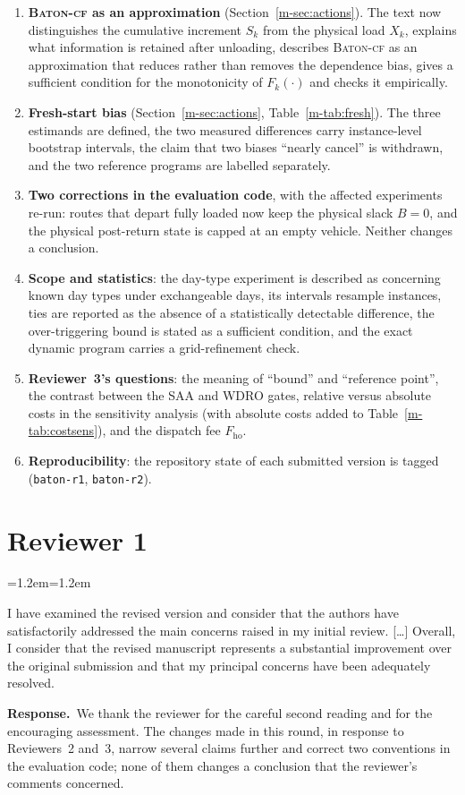 \documentclass[11pt]{article}
\newenvironment{comment}{\par\medskip\noindent\color{rev}\itshape
  \begin{list}{}{\leftmargin=1.2em\rightmargin=1.2em}\item[]}%
  {\end{list}\par}
\newcommand{\resp}{\par\noindent\textbf{Response.}\ }
\newcommand{\sref}[1]{Section~\ref{m-#1}}
\newcommand{\tref}[1]{Table~\ref{m-#1}}
\begin{document}
\begin{enumerate}[leftmargin=1.4em]
\item \textbf{\textsc{Baton-cf} as an approximation}
  (\sref{sec:actions}). The text now distinguishes the cumulative
  increment $S_k$ from the physical load $X_k$, explains what information
  is retained after unloading, describes \textsc{Baton-cf} as an
  approximation that reduces rather than removes the dependence bias,
  gives a sufficient condition for the monotonicity of $F_k(\cdot)$ and
  checks it empirically.
\item \textbf{Fresh-start bias} (\sref{sec:actions}, \tref{tab:fresh}).
  The three estimands are defined, the two measured differences carry
  instance-level bootstrap intervals, the claim that two biases ``nearly
  cancel'' is withdrawn, and the two reference programs are labelled
  separately.
\item \textbf{Two corrections in the evaluation code}, with the affected
  experiments re-run: routes that depart fully loaded now keep the
  physical slack $B = 0$, and the physical post-return state is capped at
  an empty vehicle. Neither changes a conclusion.
\item \textbf{Scope and statistics}: the day-type experiment is described
  as concerning known day types under exchangeable days, its intervals
  resample instances, ties are reported as the absence of a
  statistically detectable difference, the over-triggering bound is
  stated as a sufficient condition, and the exact dynamic program carries
  a grid-refinement check.
\item \textbf{Reviewer~3's questions}: the meaning of ``bound'' and
  ``reference point'', the contrast between the \textsc{SAA} and
  \textsc{WDRO} gates, relative versus absolute costs in the sensitivity
  analysis (with absolute costs added to \tref{tab:costsens}), and the
  dispatch fee $F_{\mathrm{ho}}$.
\item \textbf{Reproducibility}: the repository state of each submitted
  version is tagged (\texttt{baton-r1}, \texttt{baton-r2}).
\end{enumerate}

\section*{Reviewer 1}

\begin{comment}
I have examined the revised version and consider that the authors have
satisfactorily addressed the main concerns raised in my initial review.
[\ldots] Overall, I consider that the revised manuscript represents a
substantial improvement over the original submission and that my
principal concerns have been adequately resolved.
\end{comment}
\resp We thank the reviewer for the careful second reading and for the
encouraging assessment. The changes made in this round, in response to
Reviewers~2 and~3, narrow several claims further and correct two
conventions in the evaluation code; none of them changes a conclusion
that the reviewer's comments concerned.
\end{document}
